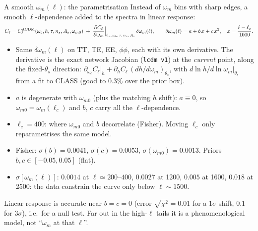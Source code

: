 \documentclass[aspectratio=169,10pt]{beamer}
\newcommand{\takeaway}[1]{%
  \begin{beamercolorbox}[wd=\textwidth,sep=0.45em]{}\colorbox{wash}{\parbox{\dimexpr\textwidth-2\fboxsep}{\small #1}}\end{beamercolorbox}}
\newcommand{\om}{\omega_m}
\begin{document}
\begin{frame}{A smooth $\om(\ell)$: the parametrisation}
\small
Instead of $\om$ bins with sharp edges, a smooth $\ell$-dependence added to the spectra in linear response:
\[ C_\ell = C_\ell^{\Lambda{\rm CDM}}(\omega_b,h,\tau,n_s,A_s,\omega_{m0}) \;+\; \frac{\partial C_\ell}{\partial\om}\Big|_{\theta_s,\,\omega_b,\,\tau,\,n_s,\,A_s}\,\delta\om(\ell),
\qquad \delta\om(\ell)=a+b\,x+c\,x^2,\quad x=\frac{\ell-\ell_c}{1000}. \]
\vspace{-0.6em}
\begin{itemize}\small
  \item Same $\delta\om(\ell)$ on TT, TE, EE, $\phi\phi$, each with its own derivative. The derivative is the exact network Jacobian (\texttt{lcdm v1}) at the \emph{current} point,
        along the fixed-$\theta_s$ direction: $\partial_{\omega_c}C_\ell|_h+\partial_h C_\ell\,(dh/d\om)_{\theta_s}$, with $d\ln h/d\ln\om|_{\theta_s}$ from a fit to CLASS (good to 0.3\% over the prior box).
  \item $a$ is degenerate with $\omega_{m0}$ (plus the matching $h$ shift): $a\equiv0$, so $\omega_{m0}=\om(\ell_c)$ and $b$, $c$ carry all the $\ell$-dependence.
  \item $\ell_c=400$: where $\omega_{m0}$ and $b$ decorrelate (Fisher). Moving $\ell_c$ only reparametrises the same model.
  \item Fisher: $\sigma(b)=0.0041$, $\sigma(c)=0.0053$, $\sigma(\omega_{m0})=0.0013$. Priors $b,c\in[-0.05,0.05]$ (flat).
  \item $\sigma[\om(\ell)]$: $0.0014$ at $\ell\simeq200$--$400$, $0.0027$ at 1200, $0.005$ at 1600, $0.018$ at 2500: the data constrain the curve only below $\ell\sim1500$.
\end{itemize}
\vspace{0.2em}
\takeaway{Linear response is accurate near $b=c=0$ (error $\sqrt{\chi^2}=0.01$ for a $1\sigma$ shift, $0.1$ for $3\sigma$), i.e.\ for a null test.
Far out in the high-$\ell$ tails it is a phenomenological model, not ``$\om$ at that $\ell$''.}
\end{frame}
\end{document}
